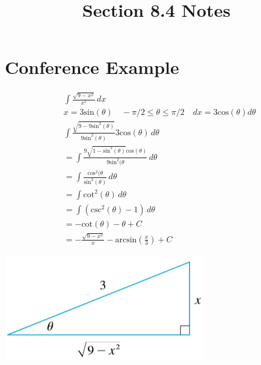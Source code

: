 \documentclass[11pt]{article}
\title{Section 8.4 Notes}
\begin{document}
\maketitle

\section*{Conference Example}

\begin{align*}
&\int \frac{\sqrt{9-x^2}}{x^2} \, dx\\
&x=3\text{sin}(\theta) \quad -\pi/2 \leq \theta \leq \pi/2 \quad dx = 3\text{cos}(\theta) d\theta\\
&\int \frac{\sqrt{9-9\text{sin}^2(\theta)}}{9\text{sin}^2(\theta)}3\text{cos}(\theta) \, d\theta\\
&=\int \frac{9\sqrt{1-\text{sin}^2(\theta)}\text{cos}(\theta)}{9\text{sin}^2(\theta} \, d\theta\\
&= \int\frac{\text{cos}^2(\theta}{\text{sin}^2(\theta)} \, d\theta\\
&=\int \text{cot}^2(\theta) \, d\theta \\
&= \int (\text{csc}^2(\theta) -1)\, d\theta \\
&= -\text{cot}(\theta) - \theta + C\\
&=-\frac{\sqrt{9-x^2}}{x} - \text{arcsin}(\frac{x}{3}) + C
\end{align*}

\includegraphics {triangle.png}
\end{document}
